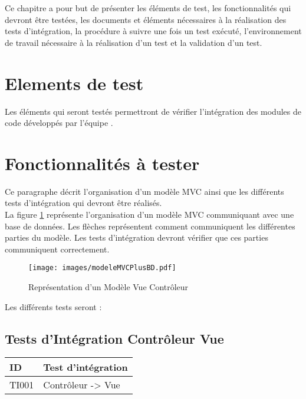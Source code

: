   
  Ce chapitre a pour but de présenter les éléments de test, les fonctionnalités qui devront être testées, les documents et éléments nécessaires à la réalisation des tests d'intégration, la procédure à suivre une fois un test exécuté, l'environnement de travail nécessaire à la réalisation d'un test et la validation d'un test. 
 
 
 \section{Elements de test}
 	Les éléments qui seront testés permettront de vérifier l'intégration des modules de code développés par l'équipe \nomEquipe.
 	
 \section{Fonctionnalités à tester}
	Ce paragraphe décrit l'organisation d'un modèle MVC ainsi que les différents tests d'intégration qui devront être réalisés. \\ 	
 	
 	La figure \ref{modeleMVC} représente l'organisation d'un modèle MVC communiquant avec une base de données. Les flèches représentent comment communiquent les différentes parties du modèle. Les tests d'intégration devront vérifier que ces parties communiquent correctement.
 	
 	\begin{figure}[H]
 		\centering
 		\texttt{[image: images/modeleMVCPlusBD.pdf]}
 		\caption{Représentation d'un Modèle Vue Contrôleur}
 		\label{modeleMVC}
 	\end{figure}
 
 
 Les différents tests seront :\\
 
 \subsection*{Tests d'Intégration Contrôleur Vue}
  \begin{center}
    \begin{tabular}[h]{|p{}|p{}|}
		\hline
		ID & Test d'intégration \\\hline
        TI001 & Contrôleur -> Vue \\\hline
     \end{tabular}
  \end{center}
  
